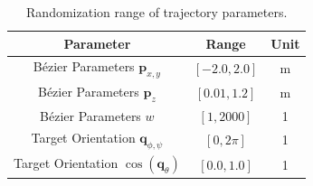 \begin{table}[]
    \centering
    \caption{Randomization range of trajectory parameters.}
    \label{tab:randomization}
    \begin{tabular}{ccc}
    \toprule
    \textbf{Parameter}            & \textbf{Range}                 & \textbf{Unit}    \\ 
    \midrule
    B\'ezier Parameters $\mathbf{p}_{x,y}$   & $[-2.0, 2.0]$ & m       \\
    B\'ezier Parameters $\mathbf{p}_{z}$   & $[0.01, 1.2]$ & m       \\
    B\'ezier Parameters $w$   & $[1, 2000]$ & 1       \\
    Target Orientation $\mathbf{q}_{\phi, \psi}$   & $[0, 2\pi]$ & 1       \\
    Target Orientation $\cos{(\mathbf{q}_{\theta})}$   & $[0.0, 1.0]$ & 1       \\
    \bottomrule
    
    \end{tabular}
    \vspace{-.2in}
\end{table}

